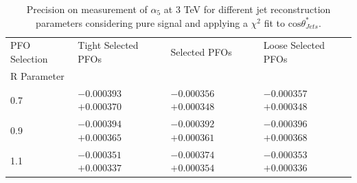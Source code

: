 \begin{table}[h!]
\centering
\begin{tabular}{l l l l}
\hline
PFO Selection & Tight Selected PFOs & Selected PFOs & Loose Selected PFOs \\ 
R Parameter & & & \\ 
\hline
0.7 & $-0.000393$ $+0.000370$ & $-0.000356$ $+0.000348$ & $-0.000357$ $+0.000348$ \\
0.9 & $-0.000394$ $+0.000365$ & $-0.000392$ $+0.000361$ & $-0.000396$ $+0.000368$ \\
1.1 & $-0.000351$ $+0.000337$ & $-0.000374$ $+0.000354$ & $-0.000353$ $+0.000336$ \\
\hline
\end{tabular}
\caption[$1\sigma$ precision on measurement of $\alpha_{5}$ for different jet reconstruction parameters considering pure signal at 3 TeV.]{Precision on measurement of $\alpha_{5}$ at 3 TeV for different jet reconstruction parameters considering pure signal and applying a $\chi^{2}$ fit to $\text{cos}\theta^{*}_{Jets}$.}
\label{table:precisiona5signaljetalgo3000GeV}
\end{table}

